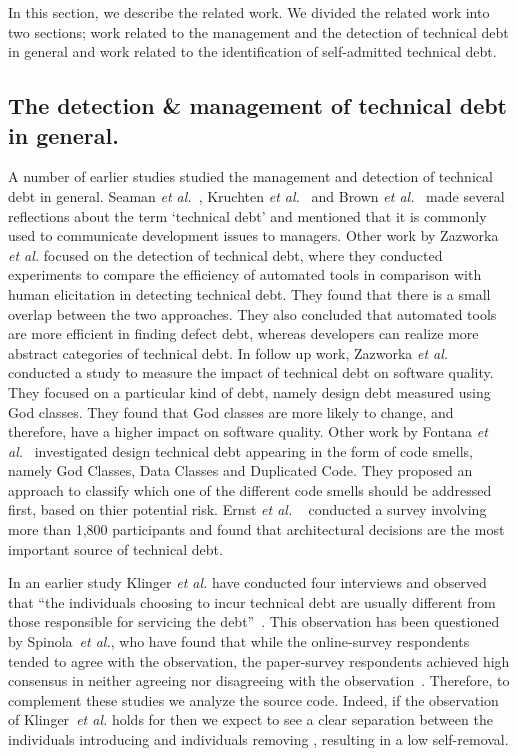 In this section, we describe the related work. We divided the related work into two sections; work related to the management and the detection of technical debt in general and work related to the identification of self-admitted technical debt.

\subsection{The detection \& management of technical debt in general.} A number of earlier studies studied the management and detection of technical debt in general. Seaman \textit{et al.}~\cite{Seaman2011}, Kruchten \textit{et al.}~\cite{Kruchten2013IWMTD} and Brown \textit{et al.}~\cite{Brown2010MTD} made several reflections about the term `technical debt' and mentioned that it is commonly used to communicate development issues to managers. Other work by Zazworka \textit{et al.} \cite{Zazworka2013EASE} focused on the detection of technical debt, where they conducted experiments to compare the efficiency of automated tools in comparison with human elicitation in detecting technical debt. They found that there is a small overlap between the two approaches. They also concluded that automated tools are more efficient in finding defect debt, whereas developers can realize more abstract categories of technical debt. In follow up work, Zazworka \textit{et al.}~\cite{Zazworka2011MTD} conducted a study to measure the impact of technical debt on software quality. They focused on a particular kind of debt, namely design debt measured using God classes. They found that God classes are more likely to change, and therefore, have a higher impact on software quality. Other work by Fontana \textit{et al.}~\cite{Fontana2012MTD} investigated design technical debt appearing in the form of code smells, namely God Classes, Data Classes and Duplicated Code. They proposed an approach to classify which one of the different code smells should be addressed first, based on thier potential risk. Ernst \textit{et al.} ~\cite{Ernst2015FSE} conducted a survey involving more than 1,800 participants and found that architectural decisions are the most important source of technical debt.



In an earlier study Klinger \textit{et al.} have conducted four interviews and observed that ``the individuals choosing to incur technical debt are usually different from those responsible for servicing the debt''~\cite{Klinger:etal}. 
This observation has been questioned by Spinola~\textit{et al.}, who have found that while the online-survey respondents tended to agree with the observation, the paper-survey respondents achieved high consensus in neither agreeing nor disagreeing with the observation~\cite{Spinola:etal}. Therefore, to complement these studies we analyze the source code.
Indeed, if the observation of Klinger~\textit{et al.} holds for \SATD then we expect to see a clear separation between the individuals introducing \SATD and individuals removing \SATD, resulting in a low \SATD self-removal.

